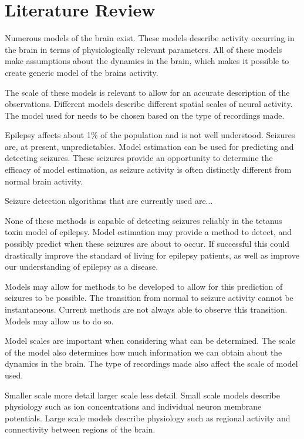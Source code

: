 \section{Literature Review}

Numerous models of the brain exist.
	These models describe activity occurring in the brain in terms of physiologically relevant parameters.
	All of these models make assumptions about the dynamics in the brain, which makes it possible to create  generic model of the brains activity.

The scale of these models is relevant to allow for an accurate description of the observations.
	Different models describe different spatial scales of neural activity.
	The model used for needs to be chosen based on the type of recordings made.

Epilepsy affects about 1\% of the population and is not well understood.
	Seizures are, at present, unpredictables.
	Model estimation can be used for predicting and detecting seizures.
	These seizures provide an opportunity to determine the efficacy of model estimation, as seizure activity is often distinctly different from normal brain activity.
	
Seizure detection algorithms that are currently used are...

None of these methods is capable of detecting seizures reliably in the tetanus toxin model of epilepsy.
	Model estimation may provide a method to detect, and possibly predict when these seizures are about to occur.
	If successful this could drastically improve the standard of living for epilepsy patients, as well as improve our understanding of epilepsy as a disease.
	
Models may allow for methods to be developed to allow for this prediction of seizures to be possible.
	The transition from normal to seizure activity cannot be instantaneous.
	Current methods are not always able to observe this transition.
	Models may allow us to do so.

Model scales are important when considering what can be determined.
	The scale of the model also determines how much information we can obtain about the dynamics in the brain. 
	The type of recordings made also affect the scale of model used. 

Smaller scale more detail larger scale less detail.
	Small scale models describe physiology such as ion concentrations and individual neuron membrane potentials.
	Large scale models describe physiology such as regional activity and connectivity between regions of the brain.

